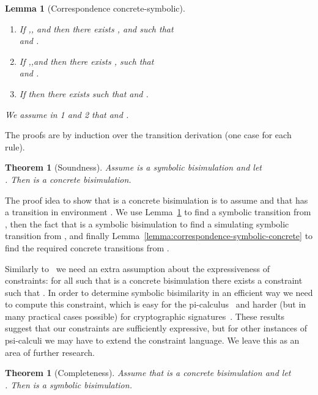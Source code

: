 \documentclass{eptcs}
\newtheorem{lemma}[definition]{Lemma}
\newtheorem{theorem}[definition]{Theorem}
\theoremstyle{definition}
\begin{document}
\begin{lemma}[Correspondence concrete-symbolic]\mbox{}\\
\label{lemma:correspondence-concrete-symbolic}
\vspace{-1\baselineskip}
\begin{enumerate}
 \item   If ,\quad ,\quad
and 
then there exists , and   such that
\\
and .
\item   If ,\quad ,\quad and 
then there exists ,  such that
\\
 and
.
\item   If 
then there exists  such that 
 and .
\end{enumerate}
We assume in 1 and 2 that  and
.
\end{lemma}

The proofs are by induction over the transition derivation (one case for each
rule).


\begin{theorem}[Soundness]
\label{theorem:soundness}
Assume  is a symbolic bisimulation and let \\ .
Then  is a concrete bisimulation.
\end{theorem}

The proof idea to show that  is a concrete bisimulation is to
assume  and that  has a
transition in environment . We use
Lemma~\ref{lemma:correspondence-concrete-symbolic} to find a symbolic transition
from , then the fact that  is a symbolic bisimulation to find a
simulating symbolic transition from , and finally
Lemma~\ref{lemma:correspondence-symbolic-concrete} to find the required concrete
transitions from . 

Similarly to~\cite{hennessy.lin:symbolic-bisimulations} we need an extra assumption about the expressiveness of constraints: for all  such that
 is a concrete bisimulation there exists a constraint  such that
.
In order to determine symbolic bisimilarity in an efficient way we
need to compute this constraint, which is easy for the
pi-calculus~\cite{boreale.de-nicola:symbolic-semantics,lin:symbolic-transition,lin:computing-bisimulations}
and harder (but in many practical cases possible) for cryptographic
signatures~\cite{borgstroem:equivalences-calculi}. These results suggest that
our constraints are sufficiently expressive, but for other instances of
psi-calculi we may have to extend the constraint language. We leave this as an
area of further research.

\begin{theorem}[Completeness]
\label{theorem:completeness}
Assume that  is a concrete bisimulation and let \\ . Then  is a symbolic
bisimulation.
\end{theorem}
\end{document}
